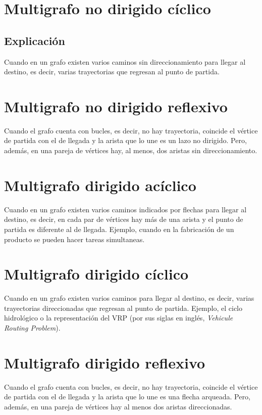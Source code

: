 \documentclass{article}
\begin{document}
 
\section{Multigrafo no dirigido cíclico}
\subsection{Explicación}
Cuando en un grafo existen varios caminos sin direccionamiento para llegar al destino, es decir, varias trayectorias que regresan al punto de partida. 



\section{Multigrafo no dirigido reflexivo}
Cuando el grafo cuenta con bucles, es decir, no hay trayectoria, coincide el vértice de partida con el de llegada y la arista que lo une es un lazo no dirigido. Pero, además, en una pareja de vértices hay, al menos, dos aristas sin direccionamiento.


\section{Multigrafo dirigido acíclico}
Cuando en un grafo existen varios caminos indicados por flechas para llegar al destino, es decir, en cada par de vértices hay  más de una arista y el punto de partida es diferente al de llegada. Ejemplo, cuando en la fabricación de un producto se pueden hacer tareas simultaneas.




\section{Multigrafo dirigido cíclico}
Cuando en un grafo existen varios caminos para llegar al destino, es decir, varias trayectorias direccionadas que regresan al punto de partida. Ejemplo, el ciclo hidrológico o la representación del VRP (por sus siglas en inglés, \textit{Vehicule Routing Problem}).


\section{Multigrafo dirigido reflexivo}
Cuando el grafo cuenta con bucles, es decir, no hay trayectoria, coincide el vértice de partida con el de llegada y la arista que lo une es una flecha arqueada. Pero, además, en una pareja de vértices hay al menos dos aristas direccionadas.





\end{document}
